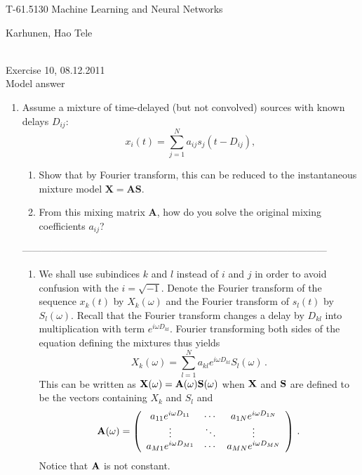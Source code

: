 \documentclass[10pt]{article}
\begin{document}
\pagestyle{empty}
\begin{Large}
\begin{bf} 
T-61.5130 Machine Learning and Neural Networks\\ 
\end{bf}
\end{Large}
Karhunen, Hao Tele\\  
\\
\begin{large}
\begin{bf}
Exercise 10,  08.12.2011\\Model answer
\end{bf}
\end{large}
\begin{enumerate}


\item Assume a mixture of time-delayed (but not convolved) sources with known delays $D_{ij}$:
\begin{displaymath}
  x_i(t) = \sum_{j=1}^N a_{ij}s_j(t-D_{ij}),
\end{displaymath}
\begin{enumerate}
\item Show that by Fourier transform, this can be reduced to the instantaneous mixture
  model $\mathbf{X} = \mathbf{A} \mathbf{S}$.
\item From this mixing matrix $\mathbf{A}$, how do you solve the original mixing
  coefficients $a_{ij}$?
\end{enumerate}

---------------------------------------------------------------------------------------------


\begin{enumerate}
\item We shall use subindices $k$ and $l$ instead of $i$ and $j$ in
  order to avoid confusion with the $i = \sqrt{-1}$.  Denote the
  Fourier transform of the sequence $x_k(t)$ by $X_k(\omega)$ and
  the Fourier transform of $s_l(t)$ by $S_l(\omega)$.  Recall that
  the Fourier transform changes a delay by $D_{kl}$ into
  multiplication with term $e^{i\omega D_{kl}}$.  Fourier
  transforming both sides of the equation defining the mixtures thus
  yields $$X_k(\omega) = \sum_{l=1}^N a_{kl} e^{i\omega D_{kl}}
  S_l(\omega) \, .$$ This can be written as $\bf{X}(\omega) =
  \bf{A}(\omega) \bf{S}(\omega)$ when $\bf{X}$ and $\bf{S}$ are
  defined to be the vectors containing $X_k$ and $S_l$ and
  \[
\bf{A}(\omega) = \left( \begin{array}{ccc} a_{11}e^{i\omega
      D_{11}} & \cdots & a_{1N}e^{i\omega D_{1N}} \\ \vdots & \ddots &
    \vdots \\ a_{M1}e^{i\omega D_{M1}} & \cdots & a_{MN}e^{i\omega
      D_{MN}} \end{array} \right) \, .
\] Notice that ${\bf A}$ is not
  constant.


\end{enumerate}
\end{enumerate}
\end{document}
